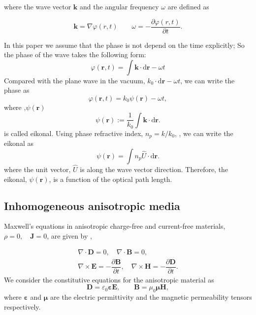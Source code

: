 \documentclass[9pt,twocolumn,twoside]{osajnl}
\begin{document}
where the wave vector $\mathbf{k}$ and the angular frequency $\omega$  are defined as

\begin{equation}
\mathbf{k}=\nabla{\varphi(r,t)} \qquad
\omega=-\dfrac{\partial{\varphi(r,t)}}{\partial{t}}.
\label{wave}
\end{equation}

In this paper we assume that the phase is not depend on the time explicitly; So the phase of the wave takes the following form:
\begin{equation}
\varphi(\mathbf{r},t)=\int{\mathbf{k}\cdot \mathrm{d}\mathbf{r}}-\omega {t}
\end{equation}
Compared with the plane wave in the vacuum, $k_{0}\cdot \mathrm{d}\mathbf{r}-\omega t $, we can write the phase as
\begin{equation}
\varphi(\mathbf{r},t)=k_{0}\psi(\mathbf{r})-\omega t ,
\end{equation}
where ,$\psi(\mathbf{r})$ 
\begin{equation}
\psi(\mathbf{r}):=\frac{1}{k_{0}}\int{\mathbf{k}\cdot \mathrm{d}\mathbf{r}}.
\end{equation}
is called eikonal.  Using phase refractive index, $n_{p}=k/k_{0}$, \cite{born1999principles}, we can write the eikonal as 
\begin{equation}
\psi(\mathbf{r})=\int{n_{p}\hat{U}\cdot \mathrm{d}\mathbf{r}}.
\end{equation}
where the unit vector, $\hat{U}$ is along the wave vector direction. 
Therefore, the eikonal, $\psi(\mathbf{r})$, is a function of the optical path length.\\


\subsection{Inhomogeneous anisotropic media}

Maxwell's equations in anisotropic charge-free and current-free materials, $\rho=0, \quad \mathbf{J}=0 $,   are given by \cite{born1999principles},

\begin{gather}
\nabla\cdot \mathbf{D} =0,\quad \nabla\cdot \mathbf{B} =0, \nonumber \\
\nabla\times\mathbf{E}=-\dfrac{\partial\mathbf{B}}{\partial t}, \quad \nabla\times\mathbf{H} =-\dfrac{\partial\mathbf{D}}{\partial t}.\label{m.h}
\end{gather}
We consider the constitutive equations for the anisotropic material as
 \begin{equation} 
 \mathbf {D}=\varepsilon_0 \boldsymbol \varepsilon \mathbf{E},  \qquad
  \mathbf{B}=\mu_0 \boldsymbol\mu \mathbf{H},
  \end{equation}
where $\boldsymbol{\varepsilon}$ and $\boldsymbol{\mu}$  are the electric permittivity and  the magnetic permeability tensors respectively. 
\end{document}
